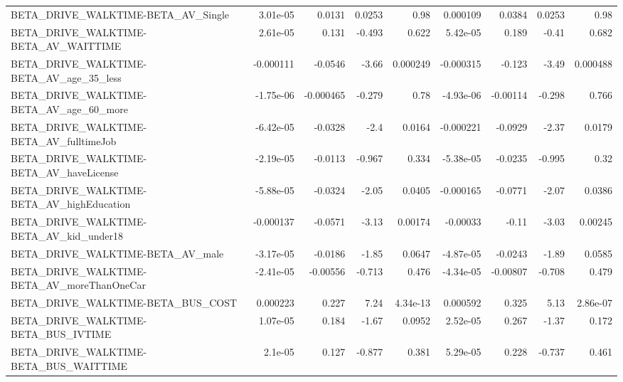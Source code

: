 \begin{tabular}{lrrrrrrrr}
BETA\_DRIVE\_WALKTIME-BETA\_AV\_Single                 &    3.01e-05 &       0.0131 &   0.0253 &     0.98 &   0.000109 &      0.0384 &       0.0253 &          0.98 \\
BETA\_DRIVE\_WALKTIME-BETA\_AV\_WAITTIME               &    2.61e-05 &        0.131 &   -0.493 &    0.622 &   5.42e-05 &       0.189 &        -0.41 &         0.682 \\
BETA\_DRIVE\_WALKTIME-BETA\_AV\_age\_35\_less            &   -0.000111 &      -0.0546 &    -3.66 & 0.000249 &  -0.000315 &      -0.123 &        -3.49 &      0.000488 \\
BETA\_DRIVE\_WALKTIME-BETA\_AV\_age\_60\_more            &   -1.75e-06 &    -0.000465 &   -0.279 &     0.78 &  -4.93e-06 &    -0.00114 &       -0.298 &         0.766 \\
BETA\_DRIVE\_WALKTIME-BETA\_AV\_fulltimeJob            &   -6.42e-05 &      -0.0328 &     -2.4 &   0.0164 &  -0.000221 &     -0.0929 &        -2.37 &        0.0179 \\
BETA\_DRIVE\_WALKTIME-BETA\_AV\_haveLicense            &   -2.19e-05 &      -0.0113 &   -0.967 &    0.334 &  -5.38e-05 &     -0.0235 &       -0.995 &          0.32 \\
BETA\_DRIVE\_WALKTIME-BETA\_AV\_highEducation          &   -5.88e-05 &      -0.0324 &    -2.05 &   0.0405 &  -0.000165 &     -0.0771 &        -2.07 &        0.0386 \\
BETA\_DRIVE\_WALKTIME-BETA\_AV\_kid\_under18            &   -0.000137 &      -0.0571 &    -3.13 &  0.00174 &   -0.00033 &       -0.11 &        -3.03 &       0.00245 \\
BETA\_DRIVE\_WALKTIME-BETA\_AV\_male                   &   -3.17e-05 &      -0.0186 &    -1.85 &   0.0647 &  -4.87e-05 &     -0.0243 &        -1.89 &        0.0585 \\
BETA\_DRIVE\_WALKTIME-BETA\_AV\_moreThanOneCar         &   -2.41e-05 &     -0.00556 &   -0.713 &    0.476 &  -4.34e-05 &    -0.00807 &       -0.708 &         0.479 \\
BETA\_DRIVE\_WALKTIME-BETA\_BUS\_COST                  &    0.000223 &        0.227 &     7.24 & 4.34e-13 &   0.000592 &       0.325 &         5.13 &      2.86e-07 \\
BETA\_DRIVE\_WALKTIME-BETA\_BUS\_IVTIME                &    1.07e-05 &        0.184 &    -1.67 &   0.0952 &   2.52e-05 &       0.267 &        -1.37 &         0.172 \\
BETA\_DRIVE\_WALKTIME-BETA\_BUS\_WAITTIME              &     2.1e-05 &        0.127 &   -0.877 &    0.381 &   5.29e-05 &       0.228 &       -0.737 &         0.461 \\

\end{tabular}
